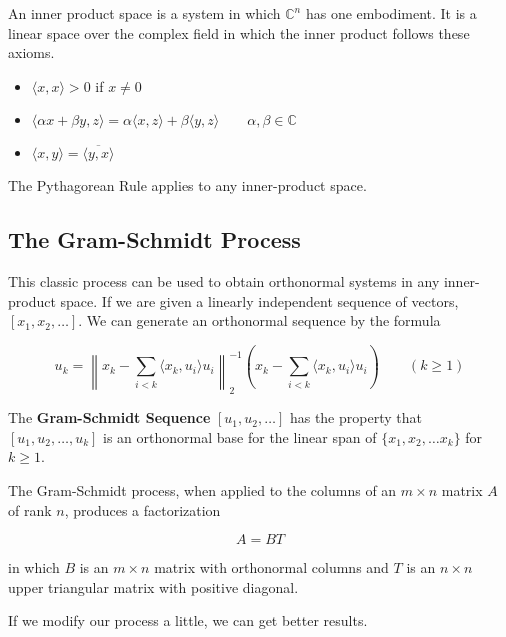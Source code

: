 An inner product space is a system in which $\mathbb{C}^n$ has one embodiment. It is a linear space over the complex
field in which the inner product follows these axioms.

\begin{itemize}
    \item $\langle x, x \rangle > 0$ if $x \neq 0$
    \item $\langle \alpha x + \beta y, z \rangle = \alpha \langle x, z \rangle + \beta \langle y, z \rangle
        \qquad \alpha, \beta \in \mathbb{C}$
    \item $\langle x, y \rangle = \overline{\langle y, x \rangle}$
\end{itemize}

The Pythagorean Rule applies to any inner-product space.

    \subsection{The Gram-Schmidt Process}
    This classic process can be used to obtain orthonormal systems in any inner-product space. If we are given a
    linearly independent sequence of vectors, $[x_1, x_2, \ldots]$. We can generate an orthonormal sequence by the
    formula

    \[
        u_k = {\left\lVert x_k - \sum_{i < k} \langle x_k, u_i \rangle u_i \right\rVert}_2^{-1}
        \left( x_k - \sum_{i < k} \langle x_k, u_i \rangle u_i \right) \qquad (k \ge 1)
    \]

    \begin{thm}
        The \textbf{Gram-Schmidt Sequence} $[u_1, u_2, \ldots]$ has the property that $[u_1, u_2, \ldots, u_k]$ is an
        orthonormal base for the linear span of $\{x_1, x_2, \ldots x_k\}$ for $k \ge 1$.
    \end{thm}

    \begin{thm}
        The Gram-Schmidt process, when applied to the columns of an $m \times n$ matrix $A$ of rank $n$, produces a
        factorization

        \[ A = BT \]

        in which $B$ is an $m \times n$ matrix with orthonormal columns and $T$ is an $n \times n$ upper triangular
        matrix with positive diagonal.
    \end{thm}

    If we modify our process a little, we can get better results.


